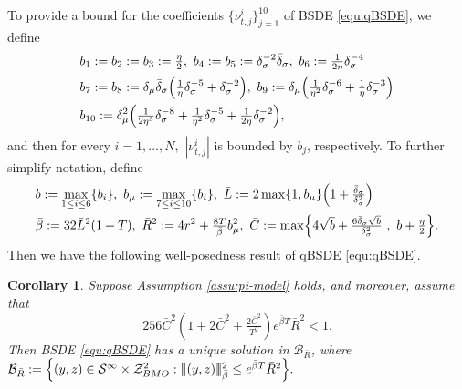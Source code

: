 \documentclass[10pt,a4paper]{article}
\newcommand{\be}{\begin{equation}}
\newcommand{\ee}{\end{equation}}
\newcommand{\bL}{\bar{L}}
\newcommand{\bC}{\bar{C}}
\newcommand{\bR}{\bar{R}}
\theoremstyle{plain}
\newtheorem{Corollary}[Theorem]{Corollary}
\theoremstyle{definition}
\numberwithin{equation}{section}
\newcommand{\trinm}[1]{\vert\!\vert\!\vert #1 \vert\!\vert\!\vert}
\begin{document}
To provide a bound for the coefficients $\{\nu^i_{t,j} \}_{j=1}^{10}$ of BSDE \eqref{equ:qBSDE}, we define
\begin{align}
&b_{1} := b_{2} := b_{3} := \tfrac{\eta}{2},\ b_{4} := b_{5} := \delta_{\sigma}^{-2}\bar{\delta}_{\sigma} , \ b_{6} := \tfrac{1}{2\eta}\delta_{\sigma}^{-4}
\label{equ:b123} \\
& b_{7} := b_{8} := \delta_{\mu}\bar{\delta}_{\sigma}\Bigl(\tfrac{1}{\eta}\delta_{\sigma}^{-5} + \delta_{\sigma}^{-2}\Bigr),\ b_{9} := \delta_{\mu}\Bigl(\tfrac{1}{\eta^{2}}\delta_{\sigma}^{-6} + \tfrac{1}{\eta}\delta_{\sigma}^{-3}\Bigr) \label{equ:b78} \\
&b_{10} := \delta_{\mu}^{2}\Bigl(\tfrac{1}{2\eta^{3}}\delta_{\sigma}^{-8}+\tfrac{1}{\eta^{2}}\delta_{\sigma}^{-5} + \tfrac{1}{2\eta}\delta_{\sigma}^{-2}\Bigr), \label{equ:b10}
\end{align}
and then for every $i=1,...,N,$ $|\nu_{t,j}^{i}|$ is bounded by $b_{j}$, respectively. To further simplify notation, define
\begin{equation}\label{equ:Defbounds}
\begin{split}
& b := \max_{1 \leq i \leq 6}\{b_{i}\} ,\  b_{\mu} := \max_{7 \leq i \leq 10}\{b_{i}\}, \ 
 \bL := 2\max\{1,b_{\mu}\}\Bigl(1+\tfrac{\bar{\delta}_{\sigma}}{\delta_{\sigma}^{2}}\Bigr) \\
&\bar \beta := 32\bL^{2}(1+T) , \ 
\bar{R}^{2} := 4 r^{2} + \tfrac{8T}{\bar \beta}b_{\mu}^{2} , \ 
\bC := \max\Bigl\{4\sqrt{b} + \tfrac{6\bar{\delta}_{\sigma}\sqrt{b}}{\delta_{\sigma}^{2}} \ , \ b + \tfrac{\eta}{2}\Bigr\}.    
\end{split}
\end{equation}
Then we have the following well-posedness result of qBSDE \eqref{equ:qBSDE}.


\begin{Corollary}
\label{Cor3.4}
Suppose Assumption \ref{assu:pi-model} holds, and moreover, assume that
\be\label{assu:modelbd}
256 {\bC}^{2}(1+2 \bC^{2}+\tfrac{2 \bC^{2}}{T^{2}})e^{ \bar{\beta} T} {\bR}^{2} < 1.
\ee
Then BSDE \eqref{equ:qBSDE} has a unique solution in $\mathcal{B}_{\bR}$, where
$
\mathcal{B}_{\bR} := \Bigl\{ (y,z) \in \mathcal{S}^{\infty} \times \mathcal{Z}_{BMO}^{2}: \trinm{(y,z)}_{\bar\beta}^{2} \leq e^{\bar\beta T}\bR^{2} \Bigr\}.
$
\end{Corollary}
\end{document}
